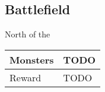 \subsection{Battlefield}
\label{map:battlefield_10}

North of the 

\noindent\begin{tabularx}{\textwidth}[l]{lX}
	Monsters
	& TODO
\\ \hline
	Reward & TODO
\end{tabularx}
